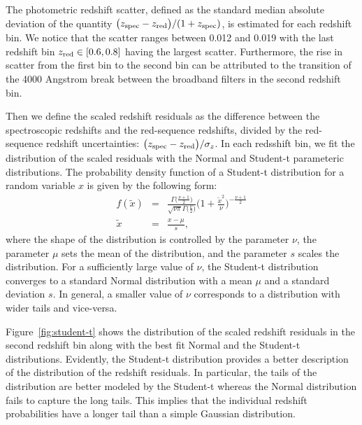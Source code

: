 \documentclass[fleqn,usenatbib,useAMS]{mnras}
\begin{document}
The photometric redshift scatter, defined as the standard median absolute deviation of the quantity $\big(z_{\rm spec} - z_{\rm red}\big)/(1+z_{\rm spec})$, is estimated for each redshift bin. We notice that the scatter ranges between 0.012 and 0.019 with the last redshift bin $z_{\rm red} \in [0.6, 0.8]$ having the largest scatter. Furthermore, the rise in scatter from the first bin to the second bin can be attributed to the transition of the 4000 Angstrom break between the broadband filters in the second redshift bin.  

Then we define the scaled redshift residuals as the difference between the spectroscopic redshifts and the red-sequence redshifts, divided by the red-sequence redshift uncertainties: $\big(z_{\rm spec} - z_{\rm red}\big)/\sigma_{z}$.
In each redsshift bin, we fit the distribution of the scaled residuals with the Normal and Student-t parameteric distributions. The probability density function of a Student-t distribution for a random variable $x$ is given by the following form:
\begin{eqnarray}
f(\tilde{x}) &=& \frac{\Gamma\big(\frac{\nu+1}{2}\big)}{\sqrt{\nu \pi}\Gamma\big(\frac{\nu}{2}\big)} \Big(1 + \frac{\tilde{x}^{2}}{\nu} \Big)^{-\frac{\nu+1}{2}} \\
\tilde{x} &=& \frac{x - \mu}{s},
\end{eqnarray}
where the shape of the distribution is controlled by the parameter $\nu$, the parameter $\mu$ sets the mean of the distribution, and the parameter $s$ scales the distribution. For a sufficiently large value of $\nu$, the Student-t distribution converges to a standard Normal distribution with a mean $\mu$ and a standard deviation $s$. In general, a smaller value of $\nu$ corresponds to a distribution with wider tails and vice-versa.  

Figure~\ref{fig:student-t} shows the distribution of the scaled redshift residuals in the second redshift bin along with the best fit Normal and the Student-t distributions. Evidently, the Student-t distribution provides a better description of the distribution of the redshift residuals. In particular, the tails of the distribution are better modeled by the Student-t whereas the Normal distribution fails to capture the long tails. This implies that the individual redshift probabilities have a longer tail than a simple Gaussian distribution.

\end{document}
